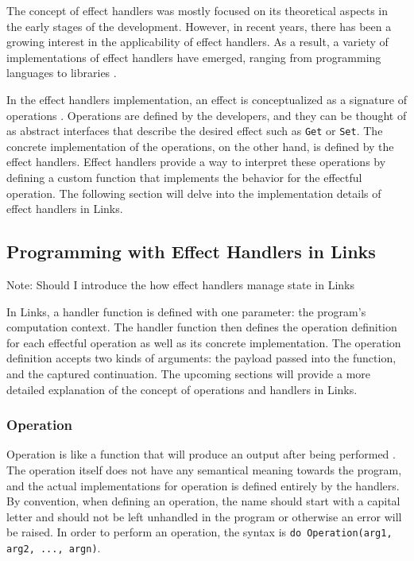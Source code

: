 \documentclass[logo,bsc,singlespacing,parskip]{infthesis}
\begin{document}
The concept of effect handlers was mostly focused on its theoretical aspects in the early stages of the development. However, in recent years, there has been a growing interest in the applicability of effect handlers. As a result, a variety of implementations of effect handlers have emerged, ranging from programming languages to libraries \cite{eff, stephen_2018, rows, kammar_2013}.

In the effect handlers implementation, an effect is conceptualized as a signature of operations  \cite{sam_effects}. Operations are defined by the developers, and they can be thought of as abstract interfaces that describe the desired effect such as \texttt{Get} or \texttt{Set}. The concrete implementation of the operations, on the other hand, is defined by the effect handlers. Effect handlers provide a way to interpret these operations by defining a custom function that implements the behavior for the effectful operation. The following section will delve into the implementation details of effect handlers in Links.

\subsection{Programming with Effect Handlers in Links}
Note: Should I introduce the how effect handlers manage state in Links

In Links, a handler function is defined with one parameter: the program's computation context. The handler function then defines the operation definition for each effectful operation as well as its concrete implementation. The operation definition accepts two kinds of arguments: the payload passed into the function, and the captured continuation. The upcoming sections will provide a more detailed explanation of the concept of operations and handlers in Links.

\subsubsection{Operation}
\label{section:operation}

Operation is like a function that will produce an output after being performed \cite{daniel_effect_links}. The operation itself does not have any semantical meaning towards the program, and the actual implementations for operation is defined entirely by the handlers. By convention, when defining an operation, the name should start with a capital letter and should not be left unhandled in the program or otherwise an error will be raised. In order to perform an operation, the syntax is \texttt{do Operation(arg1, arg2, ..., argn)}.
\end{document}
